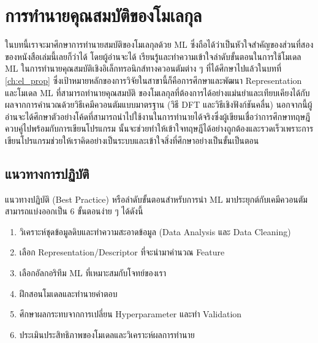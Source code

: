 

\chapter{การทำนายคุณสมบัติของโมเลกุล}
\label{ch:predict_molprop}

ในบทนี้เราจะมาศึกษาการทำนายสมบัติของโมเลกุลด้วย ML ซึ่งถือได้ว่าเป็นหัวใจสำคัญของส่วนที่สองของหนังสือเล่มนี้เลยก็ว่าได้ โดยผู้อ่านจะได้%
เรียนรู้และทำความเข้าใจลำดับขั้นตอนในการใช้โมเดล ML ในการทำนายคุณสมบัติเชิงอิเล็กทรอนิกส์ทางควอนตัมต่าง ๆ ที่ได้ศึกษาไปแล้วในบทที่ 
\ref{ch:el_prop} ซึ่งเป้าหมายหลักของการวิจัยในสาขานี้ก็คือการศึกษาและพัฒนา Representation และโมเดล ML ที่สามารถทำนายคุณสมบัติ%
ของโมเลกุลที่ต้องการได้อย่างแม่นยำและเทียบเคียงได้กับผลจากการคำนวณด้วยวิธีเคมีควอนตัมแบบมาตรฐาน (วิธี DFT และวิธีเชิงฟังก์ชันคลื่น) 
นอกจากนี้ผู้อ่านจะได้ศึกษาตัวอย่างโค้ดที่สามารถนำไปใช้งานในการทำนายได้จริงซึ่งผู้เขียนเชื่อว่าการศึกษาทฤษฎีควบคู่ไปพร้อมกับการเขียนโปรแกรม%
นั้นจะช่วยทำให้เข้าใจทฤษฎีได้อย่างถูกต้องและรวดเร็วเพราะการเขียนโปรแกรมช่วยให้เราคิดอย่างเป็นระบบและเข้าใจสิ่งที่ศึกษาอย่างเป็นขั้นเป็นตอน


\section{แนวทางการปฏิบัติ}
\label{sec:pred_best_prac}

แนวทางปฏิบัติ (Best Practice) หรือลำดับขั้นตอนสำหรับการนำ ML มาประยุกต์กับเคมีควอนตัมสามารถแบ่งออกเป็น 6 ขั้นตอนง่าย ๆ ได้ดังนี้

\begin{enumerate}
    \item วิเคราะห์ชุดข้อมูลดิบและทำความสะอาดข้อมูล (Data Analysis และ Data Cleaning)
    
    \item เลือก Representation/Descriptor ที่จะนำมาคำนวณ Feature 
    
    \item เลือกอัลกอริทึม ML ที่เหมาะสมกับโจทย์ของเรา 
    
    \item ฝึกสอนโมเดลและทำนายคำตอบ
    
    \item ศึกษาผลกระทบจากการเปลี่ยน Hyperparameter และทำ Validation
    
    \item ประเมินประสิทธิภาพของโมเดลและวิเคราะห์ผลการทำนาย
\end{enumerate}

